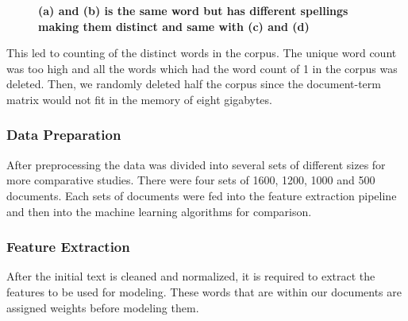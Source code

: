 \documentclass[12pt]{report}
\begin{document}
            \begin{figure}[h]
                \centering



                \caption{\textbf{(a) and (b) is the same word but has different spellings making them distinct and same with (c) and (d)}}
             \end{figure}

            This led to counting of the distinct words in the corpus. The unique word count was too high and all the words which had the 
            word count of 1 in the corpus was deleted. Then, we randomly deleted half the corpus since the document-term matrix would not 
            fit in the memory of eight gigabytes.


            \subsubsection{Data Preparation}
        
            After preprocessing the data was divided into several sets of different sizes for more comparative studies. There were four sets of 1600, 1200, 1000 and 500 documents.
            Each sets of documents were fed into the feature extraction pipeline and then into the machine learning algorithms for comparison.
            
        
        \subsubsection{Feature Extraction}
        After the initial text is cleaned and normalized, it is required to extract the features to be used for modeling.
        These words that are within our documents are assigned weights before modeling them.
        
\end{document}
